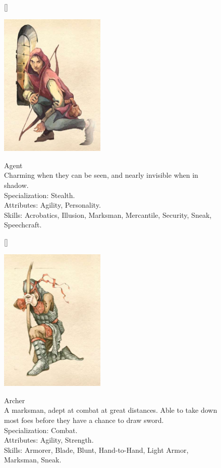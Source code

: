 \documentclass[12pt]{book}
\begin{document}
\begin{figure}[H]
[\FBwidth]
{\caption*{Agent\\

Charming when they can be seen, and nearly invisible when in shadow.\\

Specialization: Stealth.\\

Attributes: Agility, Personality.\\

Skills: Acrobatics, Illusion, Marksman, Mercantile, Security, Sneak, Speechcraft.}\label{fig:test}}
{\includegraphics[width=0.45\textwidth]{Agent.png}}
\end{figure}

\begin{figure}[H]
[\FBwidth]
{\caption*{Archer\\

A marksman, adept at combat at great distances. Able to take down most foes before they have a chance to draw sword.\\

Specialization: Combat.\\

Attributes: Agility, Strength.\\

Skills: Armorer, Blade, Blunt, Hand-to-Hand, Light Armor, Marksman, Sneak.}\label{fig:test}}
{\includegraphics[width=0.45\textwidth]{Archer.png}}
\end{figure}
\end{document}
